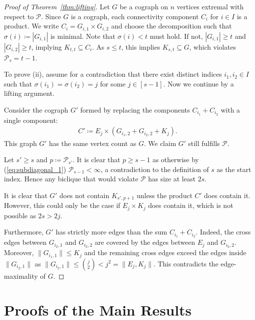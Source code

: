 \documentclass{article}
\theoremstyle{definition}
\theoremstyle{definition}
\theoremstyle{definition}
\theoremstyle{definition}
\theoremstyle{definition}
\theoremstyle{definition}
\theoremstyle{definition}
\theoremstyle{definition}
\theoremstyle{definition}
\theoremstyle{definition}
\newenvironment{proofref}[2]{%
  \begin{proof}[Proof of #1~\ref{#2}]%
}{%
  \end{proof}%
}
\begin{document}
\begin{proofref}{Theorem}{thm:lifting}   
    Let $G$ be a cograph on $n$ vertices extremal with respect to $\mathscr{P}$.
    Since $G$ is a cograph, each connectivity component $C_i$ for $i \in I$ is a product. We write $C_i = G_{i,1} \times G_{i,2}$ and choose the decomposition such that $\sigma(i) \coloneqq |G_{i,1}|$ is minimal. Note that $\sigma(i) < t$ must hold. If not, $|G_{i,1}| \geq t$ and $|G_{i,2}| \geq t$, implying $K_{t,t} \subseteq C_i$. As $s \leq t$, this implies $K_{s,t} \subseteq G$, which violates $\mathscr{P}_s = t-1$.
    
    To prove (ii), assume for a contradiction that there exist distinct indices $i_1, i_2 \in I$ such that $\sigma(i_1) = \sigma(i_2) = j$ for some $j \in [s-1]$. Now we continue by a lifting argument.
    
    Consider the cograph $G'$ formed by replacing the components $C_{i_1} + C_{i_2}$ with a single component:
    \begin{align*}
        C' \coloneqq E_j \times (G_{i_1,2} + G_{i_2,2} + K_j).
    \end{align*}
    This graph $G'$ has the same vertex count as $G$. We claim $G'$ still fulfills $\mathscr{P}$.

    Let $s' \geq s$ and $p \coloneqq \mathscr{P}_{s'}$.
    It is clear that $p \geq s-1$ as otherwise by (\ref{eq:subdiagonal_1}) $\mathscr{P}_{s-1} < \infty$, a contradiction to the definition of $s$ as the start index. Hence any biclique that would violate $\mathscr{P}$ has size at least $2s$.
    
    It is clear that $G'$ does not contain $K_{s', p+1}$ unless the product $C'$ does contain it. However, this could only be the case if $E_j \times K_j$ does contain it, which is not possible as $2s > 2 j$.
    
    Furthermore, $G'$ has strictly more edges than the sum $C_{i_1} + C_{i_2}$.
    Indeed, the cross edges between $G_{i_2, 1}$ and $G_{i_2, 2}$ are covered by the edges between $E_j$ and $G_{i_2, 2}$.
    Moreover, $\| G_{i_1, 1} \| \leq K_j$ and the remaining cross edges exceed the edges inside $\| G_{i_2, 1} \|$ as $\| G_{i_2, 1} \| \leq \binom{j}{2} < j^2 = \| E_j, K_j \|$.
    This contradicts the edge-maximality of $G$.
\end{proofref}

\section{Proofs of the Main Results} \label{sec:main_results}
\end{document}

